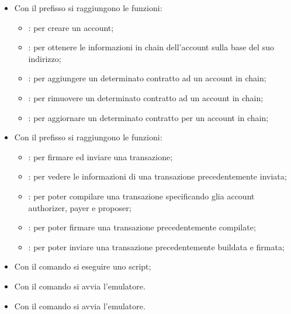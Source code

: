 \begin{itemize}
	\item Con il prefisso  si raggiungono le funzioni:
	\begin{itemize}
		\item {}: per creare un account;
		\item {}: per ottenere le informazioni in chain dell'account sulla base del suo indirizzo;
		\item {}: per aggiungere un determinato contratto ad un account in chain;
		\item {}: per rimuovere un determinato contratto ad un account in chain;
		\item {}: per aggiornare un determinato contratto per un account in chain;
	\end{itemize}
	\item Con il prefisso  si raggiungono le funzioni:
	\begin{itemize}
		\item {}: per firmare ed inviare una transazione; 
		\item {}: per vedere le informazioni di una transazione precedentemente inviata;
		\item {}: per poter compilare una transazione specificando glia account authorizer, payer e proposer;
		\item {}: per poter firmare una transazione precedentemente compilate;
		\item {}: per poter inviare una transazione precedentemente buildata e firmata;
	\end{itemize}
	\item Con il comando  si eseguire uno script;
	\item Con il comando  si avvia l'emulatore.
	\item Con il comando  si avvia l'emulatore.
\end{itemize}